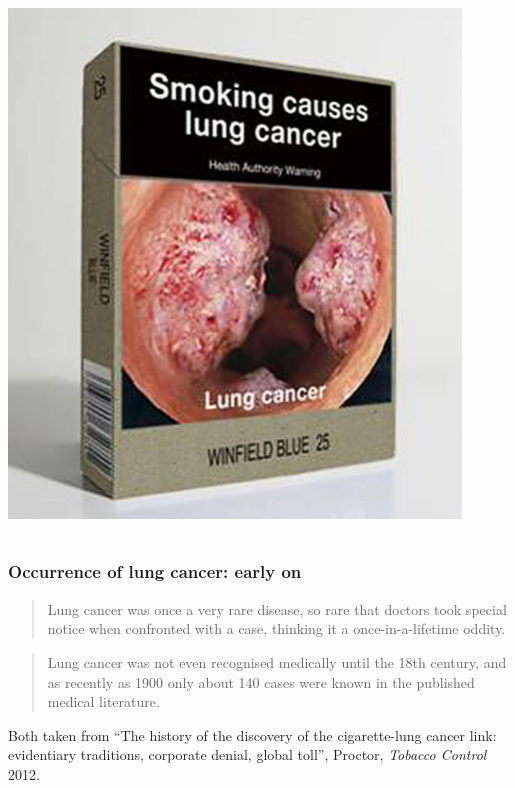 \documentclass[handout]{beamer}
\begin{document}
\begin{frame}
\begin{columns}
\begin{column}{0.48\textwidth}
			\includegraphics[width=0.9\textwidth]{../figures/cigarette_late.jpeg}
		\end{column}
	\end{columns}
	
\end{frame}

\begin{frame}
	\frametitle{Occurrence of lung cancer: early on}
	
	\begin{quotation}
		Lung cancer was once a very rare disease, so rare that doctors took special notice when confronted with a case, thinking it a once-in-a-lifetime oddity.
	\end{quotation}
	
	\begin{quotation}
		Lung cancer was not even recognised medically until the 18th century, and as recently as 1900 only about 140 cases were known in the published medical literature.
	\end{quotation}
	
	\footnotesize Both taken from ``The history of the discovery of the cigarette-lung cancer link: evidentiary traditions, corporate denial, global toll'', Proctor, \textit{Tobacco Control} 2012.
	
\end{frame}
\end{document}
